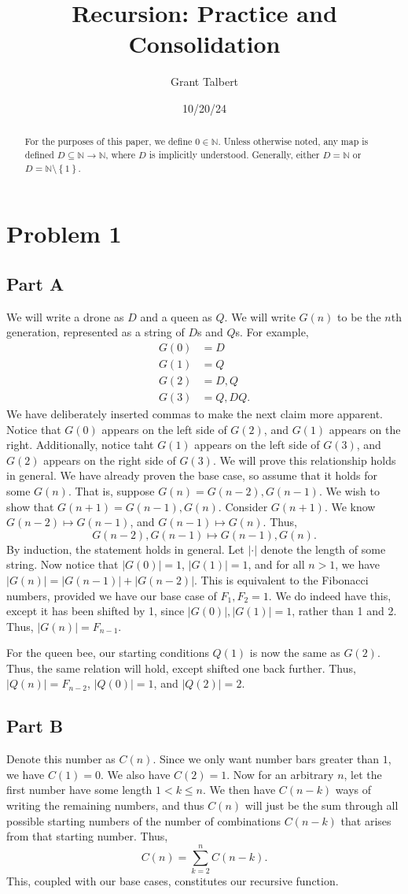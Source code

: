 \documentclass[11pt, letterpaper]{article}
\title{Recursion: Practice and Consolidation}
\date{10/20/24}
\author{Grant Talbert}
\begin{document}
\makeproblem
\begin{abstract}
	For the purposes of this paper, we define $0\in\mathbb{N}$. Unless otherwise noted, any map is defined $D\subseteq \mathbb{N} \to \mathbb{N}$, where $D$ is implicitly understood. Generally, either $D=\mathbb{N}$ or $D=\mathbb{N}\setminus\left\{ 1 \right\} $.
\end{abstract}
\section*{Problem 1}
\subsection*{Part A}
We will write a drone as $D$ and a queen as $Q$. We will write $G(n)$ to be the $n$th generation, represented as a string of $D$s and $Q$s. For example,
\begin{align*}
	G(0)&=D\\
	G(1)&=Q\\
	G(2)&=D,Q\\
	G(3)&=Q,DQ
.\end{align*}
We have deliberately inserted commas to make the next claim more apparent. Notice that $G(0)$ appears on the left side of $G(2)$, and $G(1)$ appears on the right. Additionally, notice taht $G(1)$ appears on the left side of $G(3)$, and $G(2)$ appears on the right side of $G(3)$. We will prove this relationship holds in general. We have already proven the base case, so assume that it holds for some $G(n)$. That is, suppose $G(n)=G(n-2),G(n-1)$. We wish to show that $G(n+1)=G(n-1),G(n)$. Consider $G(n+1)$. We know $G(n-2)\mapsto G(n-1)$, and $G(n-1)\mapsto G(n)$. Thus,
\[
	G(n-2),G(n-1)\mapsto G(n-1),G(n)
.\]
By induction, the statement holds in general. Let $\left| \cdot  \right| $ denote the length of some string. Now notice that $|G(0)|=1$, $|G(1)|=1$, and for all $n>1$, we have $|G(n)|=|G(n-1)|+|G(n-2)|$. This is equivalent to the Fibonacci numbers, provided we have our base case of $F_1,F_2=1$. We do indeed have this, except it has been shifted by 1, since $|G(0)|,|G(1)|=1$, rather than 1 and 2. Thus, $\left| G(n) \right| =F_{n-1}$.

For the queen bee, our starting conditions $Q(1)$ is now the same as $G(2)$. Thus, the same relation will hold, except shifted one back further. Thus, $|Q(n)|=F_{n-2}$, $\left| Q(0) \right| =1$, and $\left| Q(2) \right| =2$.
\subsection*{Part B}
Denote this number as $C(n)$. Since we only want number bars greater than $1$, we have $C(1)=0$. We also have $C(2)=1$. Now for an arbitrary $n$, let the first number have some length $1<k\leq n$. We then have $C(n-k)$ ways of writing the remaining numbers, and thus $C(n)$ will just be the sum through all possible starting numbers of the number of combinations $C(n-k)$ that arises from that starting number. Thus,
\[
	C(n)=\sum_{k=2}^{n} C(n-k)
.\]
This, coupled with our base cases, constitutes our recursive function.
\end{document}
